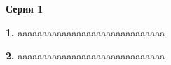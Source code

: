 \documentclass[12pt,a4paper]{article}
\def\q#1.{{\bf #1.}}
\theoremstyle{definition}
\begin{document}
\thispagestyle{firststyle}

\centerline{\bf Серия 1}


\q1. aaaaaaaaaaaaaaaaaaaaaaaaaaaaaa

\q2. aaaaaaaaaaaaaaaaaaaaaaaaaaaaaa
\end{document}

